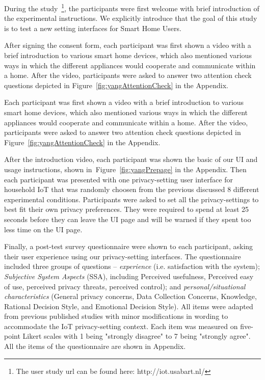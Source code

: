 During the study~\footnote{The user study url can be found here: http://iot.usabart.nl/}, the participants were first welcome with brief introduction of the experimental instructions. We explicitly introduce that the goal of this study is to test a new setting interfaces for Smart Home Users.

After signing the consent form, each participant was first shown a video with a brief introduction to various smart home devices, which also mentioned various ways in which the different appliances would cooperate and communicate within a home. After the video, participants were asked to answer two attention check questions depicted in Figure~\ref{fig:yangAttentionCheck} in the Appendix.

Each participant was first shown a video with a brief introduction to various smart home devices, which also mentioned various ways in which the different appliances would cooperate and communicate within a home. After the video, participants were asked to answer two attention check questions depicted in Figure~\ref{fig:yangAttentionCheck} in the Appendix.

After the introduction video, each participant was shown the basic of our UI and usage instructions, shown in~Figure~\ref{fig:yangPrepage} in the Appendix. Then each participant was presented with one privacy-setting user interface for household IoT that was randomly choosen from the previous discussed 8 different experimental conditions. Participants were asked to set all the privacy-settings to best fit their own privacy preferences. They were required to spend at least 25 seconds before they can leave the UI page and will be warned if they spent too less time on the UI page.

Finally, a post-test survey questionnaire were shown to each participant, asking their user experience using our privacy-setting interfaces. The questionnaire included three groups of questions -- \textit{experience} (i.e. satisfaction with the system); \textit{Subjective System Aspects} (SSA), including Perceived usefulness, Perceived easy of use, perceived privacy threats, perceived control); and \textit{personal/situational characteristics} (General privacy concerns, Data Collection Concerns, Knowledge, Rational Decision Style, and Emotional Decision Style). All items were adapted from previous published studies with minor modifications in wording to accommodate the IoT privacy-setting context. Each item was measured on five-point Likert scales with 1 being "strongly disagree" to 7 being "strongly agree". All the items of the questionnaire are shown in Appendix.


